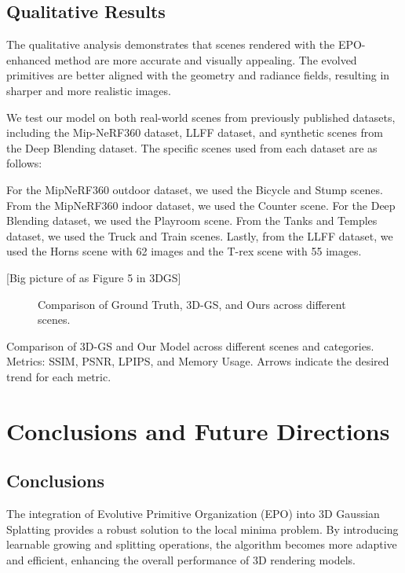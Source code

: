\documentclass[11pt]{report}
\begin{document}
\section{Qualitative Results}

The qualitative analysis demonstrates that scenes rendered with the EPO-enhanced method are more accurate and visually appealing. The evolved primitives are better aligned with the geometry and radiance fields, resulting in sharper and more realistic images.

We test our model on both real-world scenes from previously published datasets, including the Mip-NeRF360 dataset, LLFF dataset, and synthetic scenes from the Deep Blending dataset. The specific scenes used from each dataset are as follows: 

For the MipNeRF360 outdoor dataset, we used the Bicycle and Stump scenes. From the MipNeRF360 indoor dataset, we used the Counter scene. For the Deep Blending dataset, we used the Playroom scene. From the Tanks and Temples dataset, we used the Truck and Train scenes. Lastly, from the LLFF dataset, we used the Horns scene with 62 images and the T-rex scene with 55 images.

[Big picture of as Figure 5 in 3DGS]

\begin{figure}[H]
    \centering
    
    \caption{Comparison of Ground Truth, 3D-GS, and Ours across different scenes.}
    \label{fig:comparison}
\end{figure}

\begin{table}[h!]
    \centering
    
    \caption{Comparison of 3D-GS and Our Model across different scenes and categories. Metrics: SSIM, PSNR, LPIPS, and Memory Usage. Arrows indicate the desired trend for each metric.}
    \label{tab:comparison}
    \end{table}

\chapter{Conclusions and Future Directions}

\section{Conclusions}

The integration of Evolutive Primitive Organization (EPO) into 3D Gaussian Splatting provides a robust solution to the local minima problem. By introducing learnable growing and splitting operations, the algorithm becomes more adaptive and efficient, enhancing the overall performance of 3D rendering models.
\end{document}
